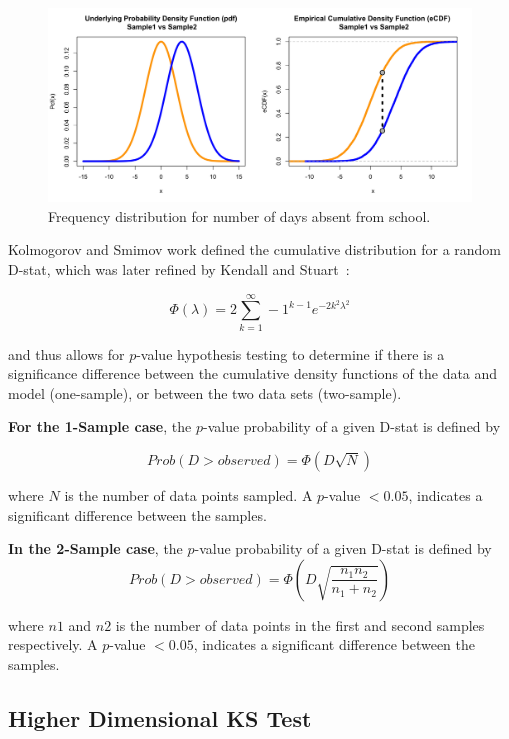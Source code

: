 \documentclass[codesnippet]{jss}
\begin{document}
\begin{figure}[t!]
\centering
\includegraphics{pdfvsCDF}
\caption{\label{fig:kstest1D} Frequency distribution for number of days absent
from school.}
\end{figure}

Kolmogorov and Smimov work defined the cumulative distribution for a random D-stat, which was later refined by Kendall and Stuart~\citep{Kendall1946}:

\begin{equation} \label{eq:1}
\Phi(\lambda) = 2 \sum_{k=1}^{\infty} -1^{k-1}e^{-2k^2\lambda^2}
\end{equation}

and thus allows for $p$-value hypothesis testing to determine if there is a significance difference between the cumulative density functions of the data and model (one-sample), or between the two data sets (two-sample).

\textbf{For the 1-Sample case}, the $p$-value probability of a given D-stat is defined by

\begin{equation} \label{eq:2}
Prob(D > observed) = \Phi ( D\sqrt{N})
\end{equation}

where $N$ is the number of data points sampled. A $p$-value $< 0.05$, indicates a significant difference between the samples.

\textbf{In the 2-Sample case}, the $p$-value probability of a given D-stat is defined by
\begin{equation} \label{eq:3}
Prob(D > observed) = \Phi ( D\sqrt{\frac{n_1n_2}{n_1+n_2}})
\end{equation}

where $n1$ and $n2$ is the number of data points in the first and second samples respectively. A $p$-value $< 0.05$, indicates a significant difference between the samples.

\subsection{Higher Dimensional KS Test}
\end{document}
